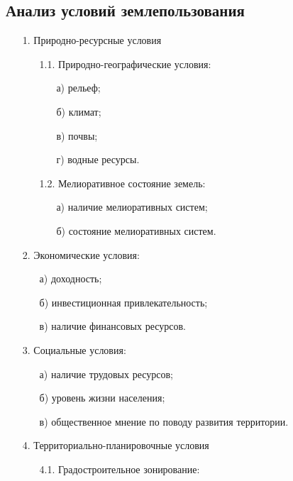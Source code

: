 \subsection{Анализ условий землепользования}
\label{subsec:zem}

\begin{enumerate}
    \item[1.] Природно-ресурсные условия
    \begin{enumerate}
        \item[1.1.] Природно-географические условия:
        \begin{enumerate}
            \item[а)] рельеф;
            \item[б)] климат;
            \item[в)] почвы;
            \item[г)] водные ресурсы.
        \end{enumerate}
        \item[1.2.] Мелиоративное состояние земель:
        \begin{enumerate}
            \item[а)] наличие мелиоративных систем;
            \item[б)] состояние мелиоративных систем.
        \end{enumerate}
    \end{enumerate}
    \item[2.] Экономические условия:
    \begin{enumerate}
        \item[а)] доходность;
        \item[б)] инвестиционная привлекательность;
        \item[в)] наличие финансовых ресурсов.
    \end{enumerate}
    \item[3.] Социальные условия:
    \begin{enumerate}
        \item[а)] наличие трудовых ресурсов;
        \item[б)] уровень жизни населения;
        \item[в)] общественное мнение по поводу развития территории.
    \end{enumerate}
    \item[4.] Территориально-планировочные условия
    \begin{enumerate}
        \item[4.1.] Градостроительное зонирование:

\end{enumerate}
\end{enumerate}
